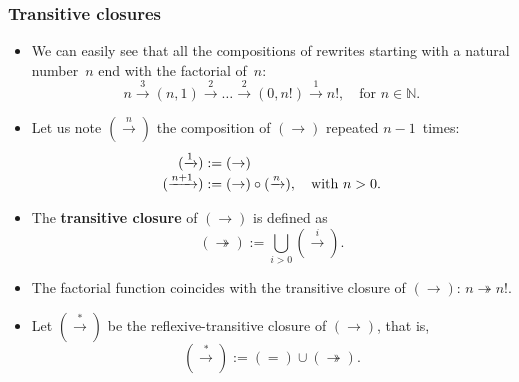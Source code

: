 \documentclass[compress,dvips,xcolor={dvipsnames},t]{beamer}
\begin{document}
\begin{frame}
  \frametitle{Transitive closures}

  \begin{itemize}

    \item We can easily see that all the compositions of rewrites
      starting with a natural number~\(n\) end with the factorial
      of~\(n\):
      \begin{equation*}
        n \xrightarrow{3} (n,1)
        \xrightarrow{2} \dots
        \xrightarrow{2} (0,n!)
        \xrightarrow{1}
        n!, \quad \text{for \(n \in \mathbb{N}\)}.
      \end{equation*}

    \item Let us note \((\xrightarrow{n})\) the composition of
      \((\rightarrow)\) repeated \(n-1\)~times:
      \begin{align*}
        (\xrightarrow{1})   &:= (\rightarrow)\\
        (\xrightarrow{\smash{n+1}}) & :=
        (\rightarrow) \circ (\xrightarrow{\smash{n}}),
        \quad\text{with \(n > 0\)}.
      \end{align*}

    \item The \textbf{transitive closure} of \((\rightarrow)\) is
      defined as
      \begin{equation*}
        (\twoheadrightarrow) := \bigcup_{i >
          0}{(\xrightarrow{i})}.
        \end{equation*}

    \item The factorial function coincides with the transitive closure
      of \((\rightarrow)\): \(n \twoheadrightarrow
      n!\).

    \item Let \((\xrightarrow{*})\) be the
      reflexive\hyp{}transitive closure of \((\rightarrow)\), that is,
      \begin{equation*}
        (\xrightarrow{*}) := (=) \cup (\twoheadrightarrow).
      \end{equation*}

  \end{itemize}

\end{frame}
\end{document}
